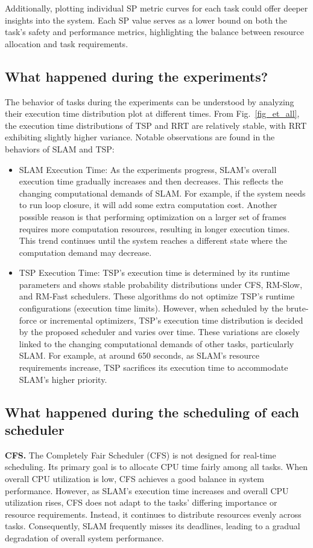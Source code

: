     Additionally, plotting individual SP metric curves for each task could offer deeper insights into the system. Each SP value serves as a lower bound on both the task's safety and performance metrics, highlighting the balance between resource allocation and task requirements.


	\subsection{What happened during the experiments?}
    The behavior of tasks during the experiments can be understood by analyzing their execution time distribution plot at different times. From Fig.~\ref{fig_et_all}, the execution time distributions of TSP and RRT are relatively stable, with RRT exhibiting slightly higher variance. Notable observations are found in the behaviors of SLAM and TSP:
    \begin{itemize}
    \item SLAM Execution Time:
    As the experiments progress, SLAM's overall execution time gradually increases and then decreases. This reflects the changing computational demands of SLAM. For example, if the system needs to run loop closure, it will add some extra computation cost. Another possible reason is that performing optimization on a larger set of frames requires more computation resources, resulting in longer execution times. This trend continues until the system reaches a different state where the computation demand may decrease.

    \item TSP Execution Time:
    TSP's execution time is determined by its runtime parameters and shows stable probability distributions under CFS, RM-Slow, and RM-Fast schedulers. These algorithms do not optimize TSP's runtime configurations (\eg execution time limits).
    However, when scheduled by the brute-force or incremental optimizers, TSP's execution time distribution is decided by the proposed scheduler and varies over time. These variations are closely linked to the changing computational demands of other tasks, particularly SLAM. For example, at around 650 seconds, as SLAM's resource requirements increase, TSP sacrifices its execution time to accommodate SLAM's higher priority.
\end{itemize}


	\subsection{What happened during the scheduling of each scheduler}
	\textbf{CFS.} The Completely Fair Scheduler (CFS) is not designed for real-time scheduling. Its primary goal is to allocate CPU time fairly among all tasks. When overall CPU utilization is low, CFS achieves a good balance in system performance. However, as SLAM's execution time increases and overall CPU utilization rises, CFS does not adapt to the tasks' differing importance or resource requirements. Instead, it continues to distribute resources evenly across tasks. Consequently, SLAM frequently misses its deadlines, leading to a gradual degradation of overall system performance.

